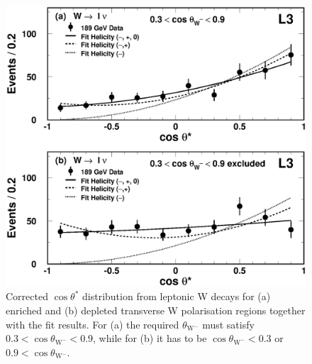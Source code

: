 \documentclass[12pt,a4paper,dvips]{article}
\newlength{\figwidth}
\begin{document}
\newpage
\begin{figure}[htbp]
  \begin{center}
    \includegraphics[width=\figwidth]{wwlongfig3.eps}
  \end{center}
  \caption{Corrected $\cos \theta^{*}$ distribution 
from leptonic W decays for (a) enriched and (b) depleted
transverse W polarisation regions together with the
fit results.
For (a) the required $\theta_{\mathrm{W}^{-}}$ must satisfy
$0.3 < \cos \theta_{\mathrm{W}^{-}}< 0.9$, while for (b) it has to be 
$\cos \theta_{\mathrm{W}^{-}}< 0.3$ or 
$ 0.9 < \cos \theta_{\mathrm{W}^{-}}$.
} 
\label{fig:wwpol3}
\end{figure}
\end{document}
